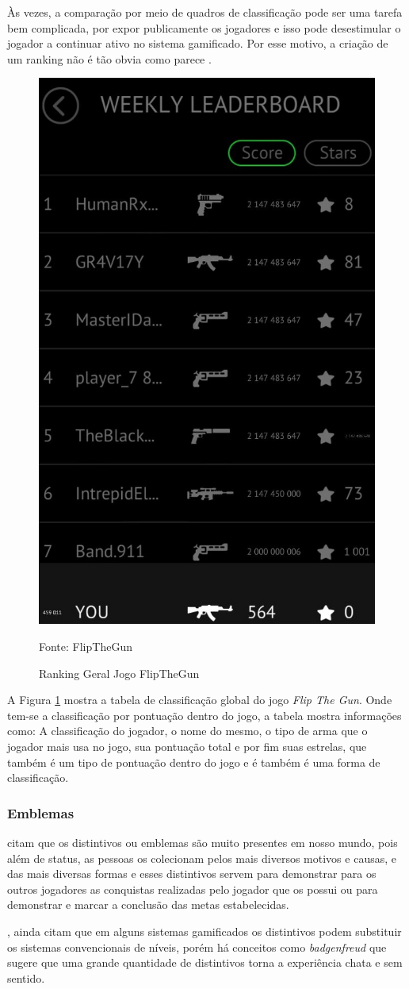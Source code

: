 		Às vezes, a comparação por meio de quadros de classificação pode ser uma tarefa bem complicada, por expor publicamente os jogadores e isso pode desestimular o jogador a continuar ativo no sistema gamificado. Por esse motivo, a criação de um ranking não é tão obvia como parece \cite{zichermann2011gamification}.
		
			\begin{figure}[H]
				\centering
				\includegraphics[width=0.3\linewidth]{img/ClassificacaoFLIPTHEGUN}
				\caption{Ranking Geral Jogo FlipTheGun}
				Fonte: FlipTheGun
				\label{flipthegunBadges}
		\end{figure}	
		A Figura \ref{flipthegunBadges} mostra a tabela de classificação global do jogo \textit{Flip The Gun}. Onde tem-se a classificação por pontuação dentro do jogo, a tabela mostra informações como: A classificação do jogador, o nome do mesmo, o tipo de arma que o jogador mais usa no jogo, sua pontuação total e por fim suas estrelas, que também é um tipo de pontuação dentro do jogo e é também é uma forma de classificação.
		
		\subsubsection{Emblemas}
		 citam que os distintivos ou emblemas são muito presentes em nosso mundo, pois além de status, as pessoas os colecionam pelos mais diversos motivos e causas, e das mais diversas formas e esses distintivos servem para demonstrar para os outros jogadores  as conquistas realizadas pelo jogador que os possui ou para demonstrar e marcar a conclusão das metas estabelecidas.
		
		, ainda citam que em alguns sistemas gamificados os distintivos podem substituir os sistemas convencionais de níveis, porém há conceitos como \textit{badgenfreud} que sugere que uma grande quantidade de distintivos torna a experiência chata e sem sentido.
		
